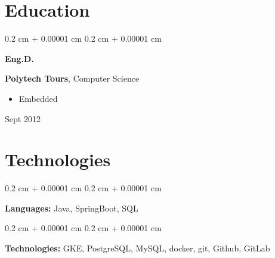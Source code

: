 \documentclass[10pt, letterpaper]{article}
\newenvironment{highlights}{
    \begin{itemize}[
        topsep=0.10 cm,
        parsep=0.10 cm,
        partopsep=0pt,
        itemsep=0pt,
        leftmargin=0.4 cm + 10pt
    ]
}{
    \end{itemize}
} %
\newenvironment{onecolentry}{
    \begin{adjustwidth}{
        0.2 cm + 0.00001 cm
    }{
        0.2 cm + 0.00001 cm
    }
}{
    \end{adjustwidth}
} %
\newenvironment{threecolentry}[3][]{
    \onecolentry
    \def\thirdColumn{#3}
    \setcolumnwidth{1 cm, \fill, 4.5 cm}
    \begin{paracol}{3}
    {\raggedright #2} \switchcolumn
}{
    \switchcolumn \raggedleft \thirdColumn
    \end{paracol}
    \endonecolentry
} %
\begin{document}
    
    \section{Education}



        
        \begin{threecolentry}{\textbf{Eng.D.}}{
            Sept 2012
        }
            \textbf{Polytech Tours}, Computer Science
            \begin{highlights}
                \item Embedded
            \end{highlights}
        \end{threecolentry}


    
    \section{Technologies}



        
        \begin{onecolentry}
            \textbf{Languages:} Java, SpringBoot, SQL
        \end{onecolentry}

        \vspace{0.2 cm}

        \begin{onecolentry}
            \textbf{Technologies:} GKE, PostgreSQL, MySQL, docker, git, Github, GitLab
        \end{onecolentry}


    
\end{document}
